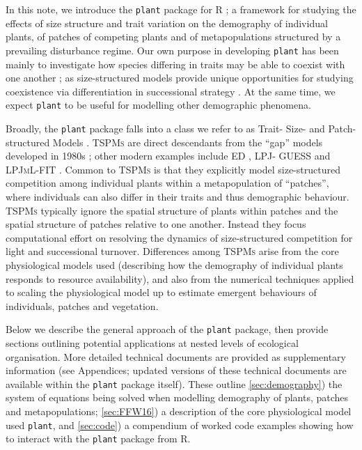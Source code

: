 \documentclass[a4paper,11pt]{article}
\newcommand{\plant}{\texttt{plant}}
\begin{document}
In this note, we introduce the {\plant} package for R \citep{R-2015};
a framework for studying the effects of size structure and
trait variation on the demography of individual plants, of patches of
competing plants and of metapopulations structured by a prevailing
disturbance regime.
%
Our own purpose in developing {\plant} has been mainly to investigate how species
differing in traits may be able to coexist with one another
\citep[following ][]{Falster-2011, Falster-2015}; as size-structured models
provide unique opportunities for studying coexistence via differentiation in
successional strategy \citep[see also][]{Huston-1987, Moorcroft-2001}.
At the same time, we expect {\plant} to be useful for modelling other demographic phenomena.

Broadly, the {\plant} package falls into a class we refer to as Trait- Size- and
Patch- structured Models \citep[\textsc{TSPMs}, following][]{Falster-2011}. \textsc{TSPMs} are direct
descendants from the ``gap'' models developed in 1980s
\citep[e.g.][]{Shugart-1980, Huston-1987, Kohyama-1993}; other modern examples
include \textsc{ED} \citep{Moorcroft-2001}, \textsc{LPJ- GUESS}
\citep{Smith-2014} and \textsc{LPJmL-FIT} \citep{Sakschewski-2015}. Common to
\textsc{TSPMs} is that they explicitly model size-structured competition
among individual plants within a metapopulation of ``patches'', where
individuals can also differ in their traits and thus demographic behaviour.
\textsc {TSPMs} typically ignore the spatial structure of plants within
patches and the spatial structure of patches relative to one another. Instead
they focus computational effort on resolving the dynamics of size-structured
competition for light and successional turnover. Differences among
\textsc{TSPMs} arise from the core physiological models used (describing
how the demography of individual plants responds to resource availability),
and also from the numerical techniques applied to scaling the physiological model up to
estimate emergent behaviours of individuals, patches and vegetation.

Below we describe the general approach of the {\plant} package, then provide
sections outlining potential applications at nested levels of ecological organisation.
More detailed technical documents are provided as supplementary information
(see Appendices; updated versions of these technical documents are
available within the {\plant} package itself). These outline \ref{sec:demography}) the system of
equations being solved when modelling demography of plants, patches and metapopulations; \ref{sec:FFW16}) a description of the core
physiological model used {\plant}, and \ref{sec:code}) a compendium of worked code examples showing how to interact with the {\plant} package from R.
\end{document}
